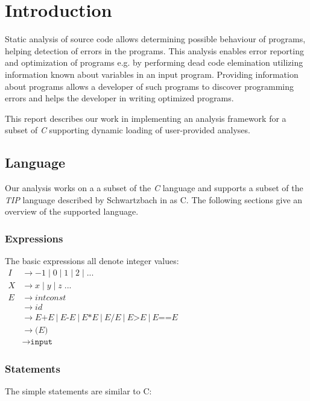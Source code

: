 \section{Introduction}

Static analysis of source code allows determining possible behaviour of programs, helping detection of errors in the programs. This analysis enables error reporting and optimization of programs e.g. by performing dead code elemination utilizing information known about variables in an input program. Providing information about programs allows a developer of such programs to discover programming errors and helps the developer in writing optimized programs.  

\newpar This report describes our work in implementing an analysis framework for a subset of \textit{C} supporting dynamic loading of user-provided analyses. 

\subsection{Language}

\newpar Our analysis works on a a subset of the \textit{C} language and supports a subset of the \textit{TIP} language described by Schwartzbach in \cite{spa} as C. The following sections give an overview of the supported language.

\subsubsection{Expressions}
The basic expressions all denote integer values: \\

$
\begin{aligned}
    I & \rightarrow -1\;|\;0\;|\;1\;|\;2\;|\;... \\
    X & \rightarrow x\;|\;y\;|\;z\;... \\
    E & \rightarrow { intconst } \\
    & \rightarrow { id } \\ 
    & \rightarrow E\texttt{+}E\:|\:E\texttt{-}E\:|\:E \texttt{*} E\:|\:E \texttt{/} E\:|\:E\texttt{>}E\:|\:E\texttt{==}E \\ 
    & \rightarrow\texttt{(}E\texttt{)} \\
    & \rightarrow\texttt{input} 
\end{aligned}
$


\subsubsection{Statements}
The simple statements are similar to C: \\

